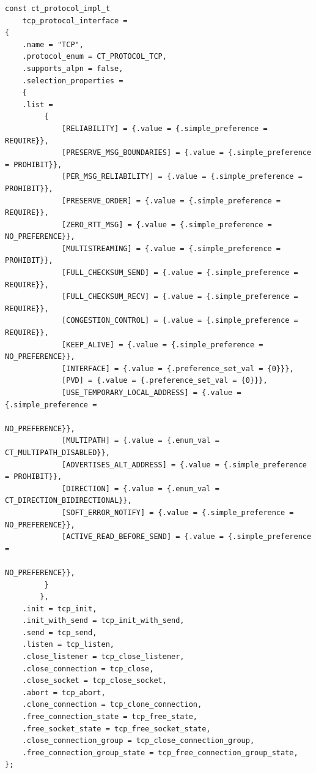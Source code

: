 \begin{listing}[htbp]
    \begin{verbatim}
const ct_protocol_impl_t
    tcp_protocol_interface =
{
    .name = "TCP",
    .protocol_enum = CT_PROTOCOL_TCP,
    .supports_alpn = false,
    .selection_properties =
    {
    .list =
         {
             [RELIABILITY] = {.value = {.simple_preference = REQUIRE}},
             [PRESERVE_MSG_BOUNDARIES] = {.value = {.simple_preference = PROHIBIT}},
             [PER_MSG_RELIABILITY] = {.value = {.simple_preference = PROHIBIT}},
             [PRESERVE_ORDER] = {.value = {.simple_preference = REQUIRE}},
             [ZERO_RTT_MSG] = {.value = {.simple_preference = NO_PREFERENCE}},
             [MULTISTREAMING] = {.value = {.simple_preference = PROHIBIT}},
             [FULL_CHECKSUM_SEND] = {.value = {.simple_preference = REQUIRE}},
             [FULL_CHECKSUM_RECV] = {.value = {.simple_preference = REQUIRE}},
             [CONGESTION_CONTROL] = {.value = {.simple_preference = REQUIRE}},
             [KEEP_ALIVE] = {.value = {.simple_preference = NO_PREFERENCE}},
             [INTERFACE] = {.value = {.preference_set_val = {0}}},
             [PVD] = {.value = {.preference_set_val = {0}}},
             [USE_TEMPORARY_LOCAL_ADDRESS] = {.value = {.simple_preference =
                                                            NO_PREFERENCE}},
             [MULTIPATH] = {.value = {.enum_val = CT_MULTIPATH_DISABLED}},
             [ADVERTISES_ALT_ADDRESS] = {.value = {.simple_preference = PROHIBIT}},
             [DIRECTION] = {.value = {.enum_val = CT_DIRECTION_BIDIRECTIONAL}},
             [SOFT_ERROR_NOTIFY] = {.value = {.simple_preference = NO_PREFERENCE}},
             [ACTIVE_READ_BEFORE_SEND] = {.value = {.simple_preference =
                                                        NO_PREFERENCE}},
         }
        },
    .init = tcp_init,
    .init_with_send = tcp_init_with_send,
    .send = tcp_send,
    .listen = tcp_listen,
    .close_listener = tcp_close_listener,
    .close_connection = tcp_close,
    .close_socket = tcp_close_socket,
    .abort = tcp_abort,
    .clone_connection = tcp_clone_connection,
    .free_connection_state = tcp_free_state,
    .free_socket_state = tcp_free_socket_state,
    .close_connection_group = tcp_close_connection_group,
    .free_connection_group_state = tcp_free_connection_group_state,
};
    \end{verbatim}
    \caption[TCP protocol interface struct]{TCP protocol interface struct.}
    \label{lst:tcp-impl-struct}
\end{listing}

